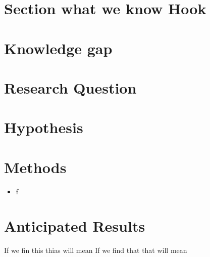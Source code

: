 \section{Section what we know Hook}

\section{Knowledge gap}
\section{Research Question}


\section{Hypothesis}

\section{Methods}

\begin{itemize}
    \item f
\end{itemize}

\section{Anticipated Results}

If we fin this thias will mean
If we find that that will mean
